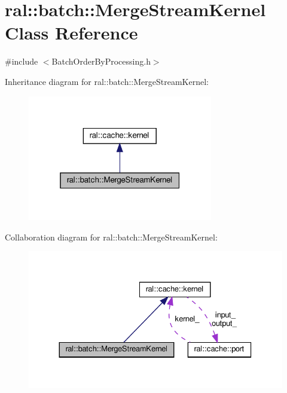 \hypertarget{classral_1_1batch_1_1MergeStreamKernel}{}\section{ral\+:\+:batch\+:\+:Merge\+Stream\+Kernel Class Reference}
\label{classral_1_1batch_1_1MergeStreamKernel}


{\ttfamily \#include $<$Batch\+Order\+By\+Processing.\+h$>$}



Inheritance diagram for ral\+:\+:batch\+:\+:Merge\+Stream\+Kernel\+:\nopagebreak
\begin{figure}[H]
\begin{center}
\leavevmode
\includegraphics[width=229pt]{classral_1_1batch_1_1MergeStreamKernel__inherit__graph}
\end{center}
\end{figure}


Collaboration diagram for ral\+:\+:batch\+:\+:Merge\+Stream\+Kernel\+:\nopagebreak
\begin{figure}[H]
\begin{center}
\leavevmode
\includegraphics[width=330pt]{classral_1_1batch_1_1MergeStreamKernel__coll__graph}
\end{center}
\end{figure}
